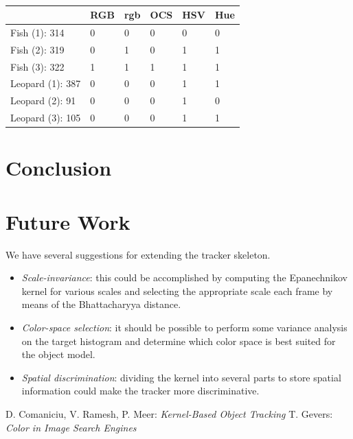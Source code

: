 \documentclass[a4paper,11pt]{article}
\begin{document}
		\begin{table}[H]
			\centering
			\begin{tabular}{ | l | l | l | l | l | l |}
			\hline
			                   & RGB & rgb & OCS & HSV & Hue \\
			\hline
			Fish    (1): 314   & 0   & 0   & 0   & 0   & 0 \\
			Fish    (2): 319   & 0   & 1   & 0   & 1   & 1 \\
			Fish    (3): 322   & 1   & 1   & 1   & 1   & 1 \\
			Leopard (1): 387   & 0   & 0   & 0   & 1   & 1 \\
			Leopard (2):  91   & 0   & 0   & 0   & 1   & 0 \\
			Leopard (3): 105   & 0   & 0   & 0   & 1   & 1 \\
			\hline
			\end{tabular}
			\caption{}
		\end{table}
		\noindent


	\section{Conclusion}

	\section{Future Work}
		We have several suggestions for extending the tracker skeleton.

		\begin{itemize}
		\item{
			\emph{Scale-invariance}: this could be accomplished by computing the
			Epanechnikov kernel for various scales and selecting the appropriate
			scale each frame by means of the Bhattacharyya distance.
		}
		\item{
			\emph{Color-space selection}: it should be possible to perform some
			variance analysis on the target histogram and determine which color
			space is best suited for the object model.
		}
		\item{
			\emph{Spatial discrimination}: dividing the kernel into several parts
			to store spatial information could make the tracker more discriminative.
		}
		\end{itemize}

	\begin{thebibliography}{2}
			D. Comaniciu, V. Ramesh, P. Meer: \textit{Kernel-Based Object Tracking}
			T. Gevers: \textit{Color in Image Search Engines}
	\end{thebibliography}
\end{document}
